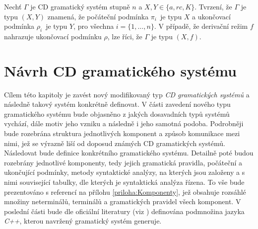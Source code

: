 \begin{konvence}
  Nechť $\Gamma$ je CD gramatický systém stupně $n$ a $X, Y \in \{a, rc, K\}$. Tvrzení, že $\Gamma$ je typu $(X, Y)$ znamená, že počáteční podmínka $\pi_i$~je typu $X$ a ukončovací podmínka $\rho_i$~je typu $Y$,
  pro všechna $i = \{1, \dots, n\}$. V případě, že derivační režim $f$ nahrazuje ukončovací podmínku $\rho$, lze říci, že $\Gamma$ je typu $(X, f)$.
\end{konvence}






\chapter{Návrh CD gramatického systému} \label{KapitolaNavrhSystemu}
Cílem této kapitoly je zavést nový modifikovaný typ \emph{CD gramatických systémů} a následně takový systém konkrétně definovat.
V části zavedení nového typu gramatického systému bude objasněno z jakých dosavadních typů systémů vychází, dále motiv jeho vzniku a následně i jeho
samotná podoba. Podrobněji bude rozebrána struktura jednotlivých komponent a způsob komunikace mezi nimi, jež se výrazně liší od doposud známých CD gramatických systémů.
Následovat bude definice konkrétního gramatického systému. Detailně poté budou rozebrány jednotlivé komponenty, tedy
jejich gramatická pravidla, počáteční a ukončující podmínky, metody syntaktické analýzy, na kterých jsou založeny a s nimi související tabulky, dle kterých je syntaktická analýza řízena.
To vše bude prezentováno s referencí na přílohu \ref{priloha:Komponenty}, jež obsahuje rozsáhlé množiny neterminálů, terminálů a gramatických pravidel všech komponent.
V poslední části bude dle oficiální literatury (viz \cite{BSI:2003:CppStandard}) definována podmnožina jazyka \emph{C++}, kterou navržený gramatický systém generuje.


